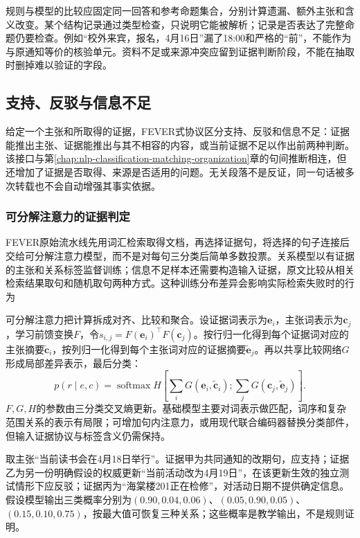 规则与模型的比较应固定同一回答和参考命题集合，分别计算遗漏、额外主张和含义改变。某个结构记录通过类型检查，只说明它能被解析；记录是否表达了完整命题仍要检查。例如“校外来宾，报名，4月16日”漏了18:00和严格的“前”，不能作为与原通知等价的核验单元。资料不足或来源冲突应留到证据判断阶段，不能在抽取时删掉难以验证的字段。

\subsection{支持、反驳与信息不足}
\label{sec:nlp-dialogue-evidence-relation}

给定一个主张和所取得的证据，FEVER式协议区分支持、反驳和信息不足：证据能推出主张、证据能推出与其不相容的内容，或当前证据不足以作出前两种判断。该接口与第\ref{chap:nlp-classification-matching-organization}章的句间推断相连，但还增加了证据是否取得、来源是否适用的问题。无关段落不是反证，同一句话被多次转载也不会自动增强其事实依据。

\subsubsection{可分解注意力的证据判定}
\label{sec:nlp-dialogue-decomposable}

FEVER原始流水线先用词汇检索取得文档，再选择证据句，将选择的句子连接后交给可分解注意力模型，而不是对每句三分类后简单多数投票。关系模型以有证据的主张和关系标签监督训练；信息不足样本还需要构造输入证据，原文比较从相关检索结果取句和随机取句两种方式。这种训练分布差异会影响实际检索失败时的行为

可分解注意力把计算拆成对齐、比较和聚合。设证据词表示为$\bm{e}_i$，主张词表示为$\bm{c}_j$，学习前馈变换$F$，令$s_{i,j}=F(\bm{e}_i)^\top F(\bm{c}_j)$。按行归一化得到每个证据词对应的主张摘要$\widetilde{\bm{c}}_i$，按列归一化得到每个主张词对应的证据摘要$\widetilde{\bm{e}}_j$。再以共享比较网络$G$形成局部差异表示，最后分类：
\begin{equation}
 p(r\mid e,c)=\operatorname{softmax}
 H\left[
 \sum_iG(\bm{e}_i,\widetilde{\bm{c}}_i);
 \sum_jG(\bm{c}_j,\widetilde{\bm{e}}_j)
 \right].
 \label{eq:nlp-dialogue-decomposable}
\end{equation}
$F,G,H$的参数由三分类交叉熵更新。基础模型主要对词表示做匹配，词序和复杂范围关系的表示有局限；可增加句内注意力，或用现代联合编码器替换分类部件，但输入证据协议与标签含义仍需保持。

取主张“当前读书会在4月18日举行”。证据甲为共同通知的改期句，应支持；证据乙为另一份明确假设的权威更新“当前活动改为4月19日”，在该更新生效的独立测试情形下应反驳；证据丙为“海棠楼201正在检修”，对活动日期不提供确定信息。假设模型输出三类概率分别为$(0.90,0.04,0.06)$、$(0.05,0.90,0.05)$、$(0.15,0.10,0.75)$，按最大值可恢复三种关系；这些概率是教学输出，不是规则证明。

